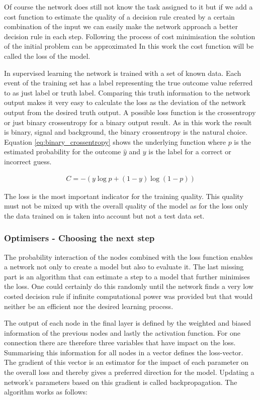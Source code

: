 Of course the network does still not know the task assigned to it but if we add a cost function to estimate the quality of a decision rule created by a certain combination of the input we can easily make the network approach a better decision rule in each step. Following the process of cost minimisation the solution of the initial problem can be approximated
In this work the cost function will be called the loss of the model.

In supervised learning the network is trained with a set of known data. Each event of the training set has a label representing the true outcome value referred to as just label or truth label. Comparing this truth information to the network output makes it very easy to calculate the loss as the deviation of the network output from the desired truth output. A possible loss function is the crossentropy or just binary crossentropy for a binary output result. As in this work the result is binary, signal and background, the binary crossentropy is the natural choice. Equation \eqref{eq:binary_crossentropy} shows the underlying function where $p$ is the estimated probability for the outcome $\hat{y}$ and $y$ is the label for a  correct or incorrect guess.

\begin{align}
    C = -(y \log p + (1 - y) \log (1 - p) )
    \label{eq:binary_crossentropy}
\end{align}

The loss is the most important indicator for the training quality. This quality must not be mixed up with the overall quality of the model as for the loss only the data trained on is taken into account but not a test data set.

\subsubsection{Optimisers - Choosing the next step}
\label{sec:optimisation}

The probability interaction of the nodes combined with the loss function enables a network not only to create a model but also to evaluate it. The last missing part is an algorithm that can estimate a step to a model that further minimises the loss. One could certainly do this randomly until the network finds a very low costed decision rule if infinite computational power was provided but that would neither be an efficient nor the desired learning process.

The output of each node in the final layer is defined by the weighted and biased information of the previous nodes and lastly the activation function. For one connection there are therefore three variables that have impact on the loss. Summarising this information for all nodes in a vector defines the loss-vector. The gradient of this vector is an estimator for the impact of each parameter on the overall loss and thereby gives a preferred direction for the model. Updating a network's parameters based on this gradient is called backpropagation. The algorithm works as follows:

